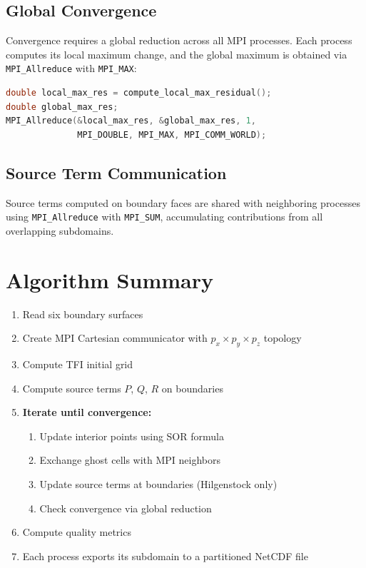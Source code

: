 \documentclass[11pt,a4paper]{report}
\begin{document}
\subsection{Global Convergence}

Convergence requires a global reduction across all MPI processes. Each process computes its local maximum change, and the global maximum is obtained via \texttt{MPI\_Allreduce} with \texttt{MPI\_MAX}:

\begin{lstlisting}[language=C]
double local_max_res = compute_local_max_residual();
double global_max_res;
MPI_Allreduce(&local_max_res, &global_max_res, 1,
              MPI_DOUBLE, MPI_MAX, MPI_COMM_WORLD);
\end{lstlisting}

\subsection{Source Term Communication}

Source terms computed on boundary faces are shared with neighboring processes using \texttt{MPI\_Allreduce} with \texttt{MPI\_SUM}, accumulating contributions from all overlapping subdomains.

\section{Algorithm Summary}

\begin{enumerate}
    \item Read six boundary surfaces
    \item Create MPI Cartesian communicator with $p_x \times p_y \times p_z$ topology
    \item Compute TFI initial grid
    \item Compute source terms $P$, $Q$, $R$ on boundaries
    \item \textbf{Iterate until convergence:}
    \begin{enumerate}
        \item Update interior points using SOR formula
        \item Exchange ghost cells with MPI neighbors
        \item Update source terms at boundaries (Hilgenstock only)
        \item Check convergence via global reduction
    \end{enumerate}
    \item Compute quality metrics
    \item Each process exports its subdomain to a partitioned NetCDF file
\end{enumerate}
\end{document}
